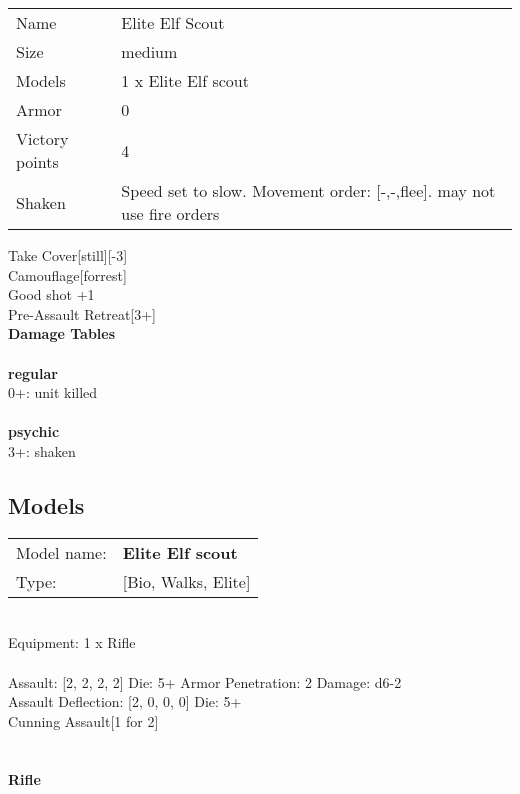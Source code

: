 \begin{tabular}{ll}
  Name & Elite Elf Scout \\
  Size & medium\\
  Models & 1 x Elite Elf scout\\
  Armor & 0\\
  Victory points & 4\\
  Shaken & Speed set to slow. Movement order: [-,-,flee]. may not use fire orders\\
\end{tabular}

Take Cover[still][-3]\\ 
Camouflage[forrest]\\ 
Good shot +1\\ 
Pre-Assault Retreat[3+]\\ 



{\bf Damage Tables} \\
\ \\ {\bf regular } \\
0+: unit killed \\
\ \\ {\bf psychic } \\
3+: shaken \\


\pagebreak

\subsection{ Models }

\begin{tabular}{ll}
Model name: & {\bf Elite Elf scout } \\
Type: & [Bio, Walks, Elite] \\
\end{tabular}
\ \\
Equipment: 1 x Rifle \\
\ \\
Assault: [2, 2, 2, 2] Die: 5+ Armor Penetration: 2 Damage: d6-2 \\
Assault Deflection: [2, 0, 0, 0] Die: 5+\\
\indent Cunning Assault[1 for 2]\\ 
 
\ \\

\ \\
{\bf Rifle } \\



